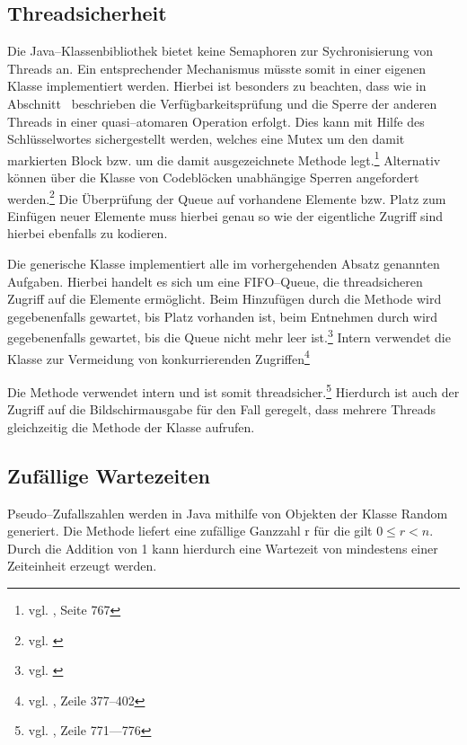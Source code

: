 
\subsection{Threadsicherheit} %
\label{sub:realisierung_mit_linkedblockingqueue}
Die Java–Klassenbibliothek bietet keine Semaphoren zur Sychronisierung von Threads an. Ein entsprechender Mechanismus müsste somit in einer eigenen Klasse implementiert werden. Hierbei ist besonders zu beachten, dass wie in Abschnitt~ beschrieben die Verfügbarkeitsprüfung und die Sperre der anderen Threads in einer quasi–atomaren Operation erfolgt. Dies kann mit Hilfe des Schlüsselwortes  sichergestellt werden, welches eine \ac{Mutex} um den damit markierten Block bzw. um die damit ausgezeichnete Methode legt.\footnote{vgl. \cite{javaorange}, Seite 767} Alternativ können über die Klasse  von Codeblöcken unabhängige Sperren angefordert werden.\footnote{vgl. \cite{javadoc:rl}} Die Überprüfung der Queue auf vorhandene Elemente bzw. Platz zum Einfügen neuer Elemente muss hierbei genau so wie der eigentliche Zugriff sind hierbei ebenfalls zu kodieren.

Die generische Klasse  implementiert alle im vorhergehenden Absatz genannten Aufgaben. Hierbei handelt es sich um eine FIFO–Queue, die threadsicheren Zugriff auf die Elemente ermöglicht. Beim Hinzufügen durch die Methode  wird gegebenenfalls gewartet, bis Platz vorhanden ist, beim Entnehmen durch  wird gegebenenfalls gewartet, bis die Queue nicht mehr leer ist.\footnote{vgl. \cite{javadoc:lbq}} Intern verwendet die Klasse  zur Vermeidung von konkurrierenden Zugriffen\footnote{vgl. \cite{javadoc:lbqsource}, Zeile 377–402}

Die Methode  verwendet intern  und ist somit threadsicher.\footnote{vgl. \cite{javadoc:println}, Zeile 771—776} Hierdurch ist auch der Zugriff auf die Bildschirmausgabe für den Fall geregelt, dass mehrere Threads gleichzeitig die Methode  der Klasse  aufrufen.

\subsection{Zufällige Wartezeiten} %
\label{sub:zufall}
Pseudo–Zufallszahlen werden in Java mithilfe von Objekten der Klasse Random generiert. Die Methode  liefert eine zufällige Ganzzahl r für die gilt $0 \leq r < n$. Durch die Addition von 1 kann hierdurch eine Wartezeit von mindestens einer Zeiteinheit erzeugt werden.

